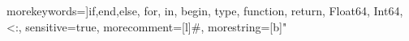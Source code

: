 {
 morekeywords=\color{blue}]{if,end,else, for, in, begin, type, function, return, Float64, Int64, <:},
 sensitive=true,
 morecomment=[l]{\#},%
 morestring=[b]"
 }
